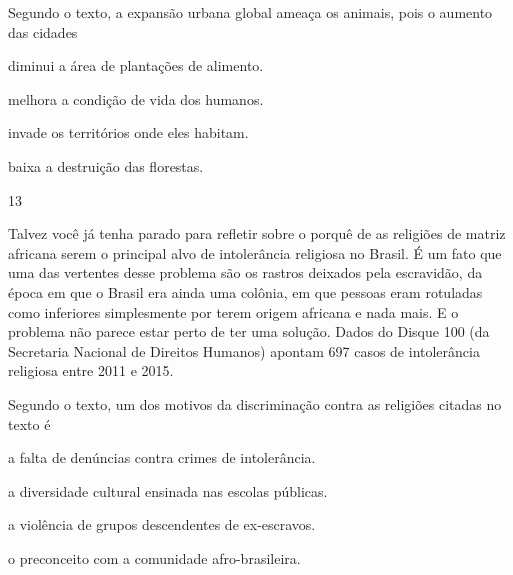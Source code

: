 \noindent{}Segundo o texto, a expansão urbana global ameaça os animais, pois o
aumento das cidades

\begin{escolha}
\item diminui a área de plantações de alimento.

\item melhora a condição de vida dos humanos.

\item invade os territórios onde eles habitam.

\item baixa a destruição das florestas.
\end{escolha}



\num{13}

\begin{myquote}
Talvez você já tenha parado para refletir sobre o porquê de as religiões de matriz africana serem o principal alvo de intolerância religiosa no Brasil.
É um fato que uma das vertentes desse problema são os rastros deixados pela escravidão, da época em que o Brasil era ainda uma colônia, em que pessoas eram rotuladas como inferiores simplesmente por terem origem africana e nada mais.
E o problema não parece estar perto de ter uma solução. Dados do Disque 100 (da Secretaria Nacional de Direitos Humanos) apontam 697 casos de intolerância religiosa entre 2011 e 2015.

\end{myquote}

Segundo o texto, um dos motivos da discriminação contra as religiões
citadas no texto é

\begin{escolha}
\item a falta de denúncias contra crimes de intolerância.

\item a diversidade cultural ensinada nas escolas públicas.

\item a violência de grupos descendentes de ex-escravos.

\item o preconceito com a comunidade afro-brasileira.
\end{escolha}


